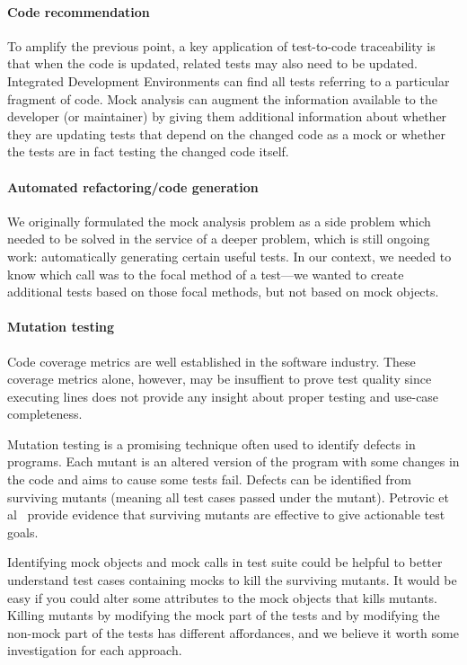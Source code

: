 \paragraph{Code recommendation}
To amplify the previous point, a key application of test-to-code
traceability is that when the code is updated, related tests may also
need to be updated. Integrated Development Environments can find
all tests referring to a particular fragment of code. Mock analysis
can augment the information available to the developer (or maintainer) by
giving them additional information about whether they are updating
tests that depend on the changed code as a mock or whether the tests
are in fact testing the changed code itself.

\paragraph{Automated refactoring/code generation}
We originally formulated the mock analysis problem as a side problem which needed
to be solved in the service of a deeper problem, which is still
ongoing work: automatically generating certain useful tests. In our context,
we needed to know which call was to the focal method of a test---we
wanted to create additional tests based on those focal methods, but
not based on mock objects.

\paragraph{Mutation testing}
Code coverage metrics are well established in the software industry. These coverage metrics alone, however, may be insuffient to prove test quality since executing lines does not provide any insight about proper testing and use-case completeness.

Mutation testing is a promising technique often used to identify defects in programs. Each mutant is an altered version of the program with some changes in the code and aims to cause some tests fail. Defects can be identified from surviving mutants (meaning all test cases passed under the mutant). Petrovic et al~\cite{Petrovic:mutation_testing} provide evidence that surviving mutants are effective to give actionable test goals.

Identifying mock objects and mock calls in test suite could be helpful to better understand test cases containing mocks to kill the surviving mutants. It would be easy if you could alter some attributes to the mock objects that kills mutants.  Killing mutants by modifying the mock part of the tests and by modifying the non-mock part of the tests has different affordances, and we believe it worth some investigation for each approach.

